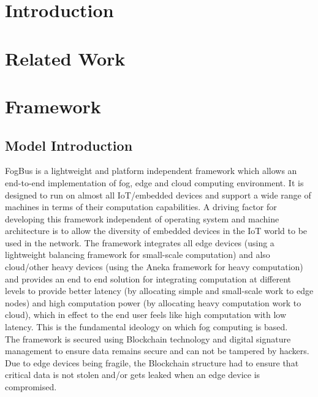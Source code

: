 \documentclass[10pt,journal,compsoc]{IEEEtran}
\begin{document}
%
\IEEEpeerreviewmaketitle

\section{Introduction}


\section{Related Work}

\clearpage

\section{Framework}

\subsection{Model Introduction}

FogBus is a lightweight and platform independent framework which allows an end-to-end implementation of fog, edge and cloud computing environment. It is designed to run on almost all IoT/embedded devices and support a wide range of machines in terms of their computation capabilities. A driving factor for developing this framework independent of operating system and machine architecture is to allow the diversity of embedded devices in the IoT world to be used in the network. The framework integrates all edge devices (using a lightweight balancing framework for small-scale computation) and also cloud/other heavy devices (using the Aneka framework for heavy computation) and provides an end to end solution for integrating computation at different levels to provide better latency (by allocating simple and small-scale work to edge nodes) and high computation power (by allocating heavy computation work to cloud), which in effect to the end user feels like high computation with low latency. This is the fundamental ideology on which fog computing is based.\\
The framework is secured using Blockchain technology and digital signature management to ensure data remains secure and can not be tampered by hackers. Due to edge devices being fragile, the Blockchain structure had to ensure that critical data is not stolen and/or gets leaked when an edge device is compromised. 
\end{document}
